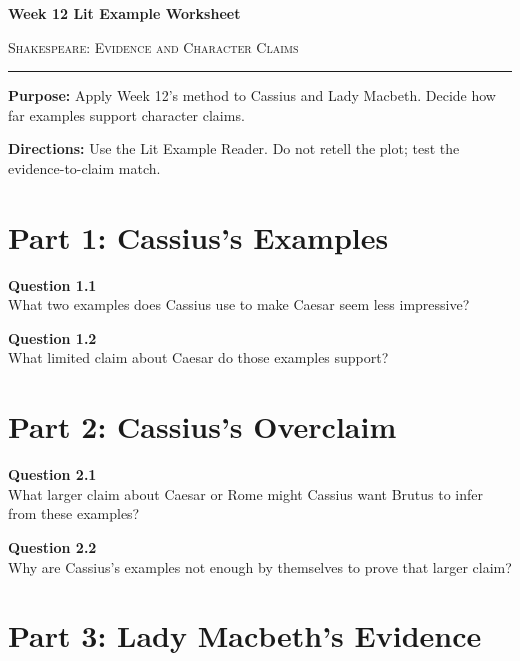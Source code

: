 \documentclass[12pt]{article}
\begin{document}
\begin{center}
{\LARGE\bfseries Week 12 Lit Example Worksheet}\par\vspace{0.05em}
{\large\scshape Shakespeare: Evidence and Character Claims}\par\vspace{0.12em}
\rule{0.78\textwidth}{0.5pt}
\end{center}

\textbf{Purpose:} Apply Week 12's method to Cassius and Lady Macbeth. Decide how far examples support character claims.

\textbf{Directions:} Use the Lit Example Reader. Do not retell the plot; test the evidence-to-claim match.

\section*{Part 1: Cassius's Examples}

\textbf{Question 1.1}\\[-0.15em]
What two examples does Cassius use to make Caesar seem less impressive?


\textbf{Question 1.2}\\[-0.15em]
What limited claim about Caesar do those examples support?


\newpage

\section*{Part 2: Cassius's Overclaim}

\textbf{Question 2.1}\\[-0.15em]
What larger claim about Caesar or Rome might Cassius want Brutus to infer from these examples?


\textbf{Question 2.2}\\[-0.15em]
Why are Cassius's examples not enough by themselves to prove that larger claim?


\newpage

\section*{Part 3: Lady Macbeth's Evidence}
\end{document}
